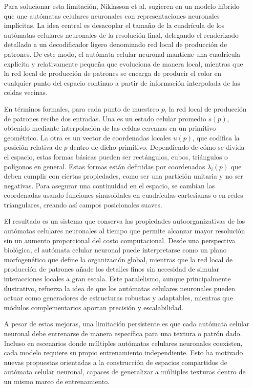 Para solucionar esta limitación, Niklasson et al. sugieren en \cite{meshNCA2} un modelo híbrido que une autómatas celulares neuronales  con representaciones neuronales implícitas. La idea central es desacoplar el tamaño de la cuadrícula de los autómatas celulares neuronales  de la resolución final, delegando el renderizado detallado a un decodificador ligero denominado red local de producción de patrones. De este modo, el autómata celular neuronal mantiene una cuadrícula explícita y relativamente pequeña que evoluciona de manera local, mientras que la red local de producción de patrones se encarga de producir el color en cualquier punto del espacio continuo a partir de información interpolada de las celdas vecinas.

En términos formales, para cada punto de muestreo $p$, la red local de producción de patrones recibe dos entradas. Una es un estado celular promedio $s(p)$, obtenido mediante interpolación de las celdas cercanas en un primitivo geométrico. La otra es un vector de coordenadas locales $u(p)$, que codifica la posición relativa de $p$ dentro de dicho primitivo. Dependiendo de cómo se divida el espacio, estas formas básicas pueden ser rectángulos, cubos, triángulos o polígonos en general. Estas formas están definidas por coordenadas $\lambda_i(p)$ que deben cumplir con ciertas propiedades, como ser una partición unitaria y no ser negativas. Para asegurar una continuidad en el espacio, se cambian las coordenadas usando funciones sinusoidales en cuadrículas cartesianas o en redes triangulares, creando así campos posicionales suaves.

El resultado es un sistema que conserva las propiedades autoorganizativas de los autómatas celulares neuronales al tiempo que permite alcanzar mayor resolución sin un aumento proporcional del costo computacional. Desde una perspectiva biológica, el autómata celular neuronal puede interpretarse como un plano morfogenético que define la organización global, mientras que la red local de producción de patrones añade los detalles finos sin necesidad de simular interacciones locales a gran escala. Este paralelismo, aunque principalmente ilustrativo, refuerza la idea de que los autómatas celulares neuronales pueden actuar como generadores de estructuras robustas y adaptables, mientras que módulos complementarios aportan precisión y escalabilidad.

A pesar de estas mejoras, una limitación persistente es que cada autómata celular neuronal debe entrenarse de manera específica para una textura o patrón dado. Incluso en escenarios donde múltiples autómatas celulares neuronales coexisten, cada modelo requiere su propio entrenamiento independiente. Esto ha motivado nuevas propuestas orientadas a la construcción de espacios compartidos de autómata celular neuronal, capaces de generalizar a múltiples texturas dentro de un mismo marco de entrenamiento.